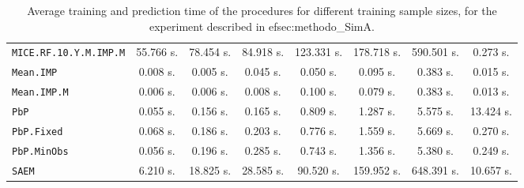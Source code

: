 \begin{table}[htbp]
\begin{tabular}{|l|c|c|c|c|c|c|c|}
\texttt{MICE.RF.10.Y.M.IMP.M} & 55.766 s. & 78.454 s. & 84.918 s. & 123.331 s. & 178.718 s. & 590.501 s. & 0.273 s. \\
\texttt{Mean.IMP} & 0.008 s. & 0.005 s. & 0.045 s. & 0.050 s. & 0.095 s. & 0.383 s. & 0.015 s. \\
\texttt{Mean.IMP.M} & 0.006 s. & 0.006 s. & 0.008 s. & 0.100 s. & 0.079 s. & 0.383 s. & 0.013 s. \\
\texttt{PbP} & 0.055 s. & 0.156 s. & 0.165 s. & 0.809 s. & 1.287 s. & 5.575 s. & 13.424 s. \\
\texttt{PbP.Fixed} & 0.068 s. & 0.186 s. & 0.203 s. & 0.776 s. & 1.559 s. & 5.669 s. & 0.270 s. \\
\texttt{PbP.MinObs} & 0.056 s. & 0.196 s. & 0.285 s. & 0.743 s. & 1.356 s. & 5.380 s. & 0.249 s. \\
\texttt{SAEM} & 6.210 s. & 18.825 s. & 28.585 s. & 90.520 s. & 159.952 s. & 648.391 s. & 10.657 s. \\
\bottomrule
\end{tabular}
\caption{Average training and prediction time of the procedures for different training sample sizes, for the experiment described in 
ef{sec:methodo_SimA}.}
\label{tab:runtimeSimA}
\end{table}

